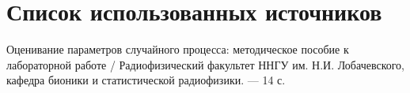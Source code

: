\section*{Список использованных источников}
{}

\begin{enumerate}[label={[\arabic*]}]
	\item Оценивание параметров случайного процесса: методическое пособие к лабораторной работе / Радиофизический факультет ННГУ им. Н.И. Лобачевского, кафедра бионики и статистической радиофизики. --- 14 с.
\end{enumerate}

